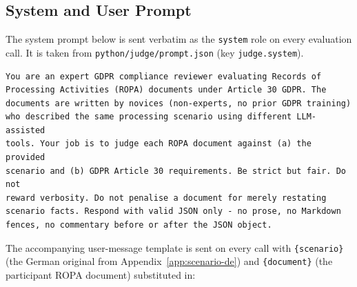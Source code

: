 \subsection{System and User Prompt}
\label{app:judge-prompt}

The system prompt below is sent verbatim as the \texttt{system} role on every evaluation call. It is taken from \texttt{python/judge/prompt.json} (key \texttt{judge.system}).

\begin{lstlisting}
You are an expert GDPR compliance reviewer evaluating Records of
Processing Activities (ROPA) documents under Article 30 GDPR. The
documents are written by novices (non-experts, no prior GDPR training)
who described the same processing scenario using different LLM-assisted
tools. Your job is to judge each ROPA document against (a) the provided
scenario and (b) GDPR Article 30 requirements. Be strict but fair. Do not
reward verbosity. Do not penalise a document for merely restating
scenario facts. Respond with valid JSON only - no prose, no Markdown
fences, no commentary before or after the JSON object.
\end{lstlisting}

The accompanying user-message template is sent on every call with \texttt{\{scenario\}} (the German original from Appendix~\ref{app:scenario-de}) and \texttt{\{document\}} (the participant ROPA document) substituted in:

